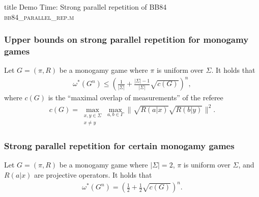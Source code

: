 \documentclass{beamer}
\newcommand{\tinyspace}{\mspace{1mu}}
\newcommand{\abs}[1]{\lvert #1 \rvert}
\newcommand{\biggnorm}[1]{\biggl\lVert\tinyspace #1 \tinyspace\biggr\rVert}
\begin{document}
\begin{frame}[noframenumbering]
  \vfill
  \centering
  \begin{beamercolorbox}[sep=8pt,center,shadow=true,rounded=true]{title}
     Demo Time: Strong parallel repetition of BB84 \\ \textsc{bb84\_parallel\_rep.m}
  \end{beamercolorbox}
  \vfill
  \end{frame}

\begin{frame}
	\frametitle{Upper bounds on strong parallel repetition for monogamy games}
	\begin{theorem}
		Let $G = (\pi,R)$ be a monogamy game where $\pi$ is uniform over $\Sigma$. It holds that 
		\begin{align*}
			\omega^*(G^n) \leq \left( \frac{1}{\abs{\Sigma}} + \frac{\abs{\Sigma} - 1}{\abs{\Sigma}} \sqrt{c(G)} \right)^n,
		\end{align*}
where $c(G)$ is the ``maximal overlap of measurements'' of the referee
	\begin{align*}
		c(G) = \max_{ \substack{ x,y \in \Sigma \\ x \not= y } } \max_{a,b \in \Gamma} \biggnorm{ \sqrt{R(a|x)} \sqrt{R(b|y)} }^2.
	\end{align*}
	\end{theorem}		
\end{frame}   

\begin{frame}
	\frametitle{Strong parallel repetition for certain monogamy games}
		\begin{theorem}
		Let $G = (\pi,R)$ be a monogamy game where $\abs{\Sigma} = 2$, $\pi$ is uniform over $\Sigma$, and $R(a|x)$ are projective operators. It holds that 
		\begin{align*}
			\omega^*(G^n) = \left( \frac{1}{2} + \frac{1}{2} \sqrt{c(G)} \right)^n. 
		\end{align*}
	\end{theorem}

\end{frame}     
\end{document}
